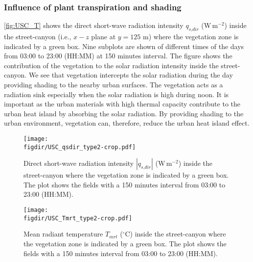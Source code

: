 \subsubsection*{Influence of plant transpiration and shading}

\cref{fig:USC_T} shows the direct short-wave radiation intensity $q_{\textit{s,dir}}$ (W\,m$^{-2}$) inside the street-canyon (i.e., $x-z$ plane at $y=125$ m) where the vegetation zone is indicated by a green box. Nine subplots are shown of different times of the days from 03:00 to 23:00 (HH:MM) at 150 minutes interval. The figure shows the contribution of the vegetation to the solar radiation intensity inside the street-canyon. We see that vegetation intercepts the solar radiation during the day providing shading to the nearby urban surfaces. The vegetation acts as a radiation sink especially when the solar radiation is high during noon. It is important as the urban materials with high thermal capacity contribute to the urban heat island by absorbing the solar radiation. By providing shading to the urban environment, vegetation can, therefore, reduce the urban heat island effect.  

\begin{sidewaysfigure}[p]
	\centering
	\texttt{[image: \\figdir/USC\_qsdir\_type2-crop.pdf]}
	\caption{Direct short-wave radiation intensity $|q_{\textit{s,dir}}|$ (W\,m$^{-2}$) inside the street-canyon where the vegetation zone is indicated by a green box. The plot shows the fields with a 150 minutes interval from 03:00 to 23:00 (HH:MM).}
	\label{fig:USC_qrdir}
\end{sidewaysfigure}

\begin{sidewaysfigure}[p]
	\centering
	\texttt{[image: \\figdir/USC\_Tmrt\_type2-crop.pdf]}
	\caption{Mean radiant temperature $T_{\textit{mrt}}$  ($^{\circ}$C) inside the street-canyon where the vegetation zone is indicated by a green box. The plot shows the fields with a 150 minutes interval from 03:00 to 23:00 (HH:MM).}
	\label{fig:USC_Tmrt}
\end{sidewaysfigure}



